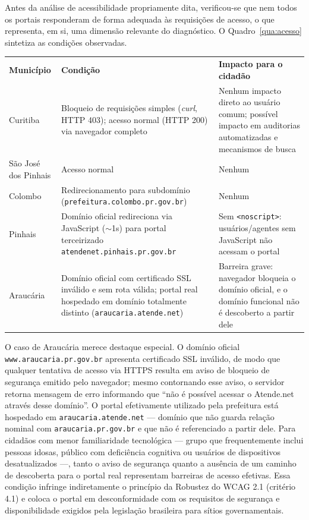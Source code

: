 \documentclass[brazil]{ifpr-pinhais}
\begin{document}
Antes da análise de acessibilidade propriamente dita, verificou-se que nem todos os portais responderam de forma adequada às requisições de acesso, o que representa, em si, uma dimensão relevante do diagnóstico. O Quadro~\ref{qua:acesso} sintetiza as condições observadas.

\begin{quadro}[htb]
\caption{Condições de acesso aos portais durante a coleta de dados}
\label{qua:acesso}
\begin{tabular}{p{2.8cm} p{6.2cm} p{5cm}}
\rowcolor{headerblue}
\color{white}\textbf{Município} & \color{white}\textbf{Condição} & \color{white}\textbf{Impacto para o cidadão} \\
Curitiba             & Bloqueio de requisições simples (\textit{curl}, HTTP 403); acesso normal (HTTP 200) via navegador completo & Nenhum impacto direto ao usuário comum; possível impacto em auditorias automatizadas e mecanismos de busca \\
São José dos Pinhais & Acesso normal                    & Nenhum \\
Colombo              & Redirecionamento para subdomínio (\texttt{prefeitura.colombo.pr.gov.br}) & Nenhum \\
Pinhais              & Domínio oficial redireciona via JavaScript ($\sim$1s) para portal terceirizado \texttt{atendenet.pinhais.pr.gov.br} & Sem \texttt{<noscript>}: usuários/agentes sem JavaScript não acessam o portal \\
Araucária            & Domínio oficial com certificado SSL inválido e sem rota válida; portal real hospedado em domínio totalmente distinto (\texttt{araucaria.atende.net}) & Barreira grave: navegador bloqueia o domínio oficial, e o domínio funcional não é descoberto a partir dele \\
\end{tabular}
\end{quadro}

O caso de Araucária merece destaque especial. O domínio oficial \texttt{www.araucaria.pr.gov.br} apresenta certificado SSL inválido, de modo que qualquer tentativa de acesso via HTTPS resulta em aviso de bloqueio de segurança emitido pelo navegador; mesmo contornando esse aviso, o servidor retorna mensagem de erro informando que ``não é possível acessar o Atende.net através desse domínio''. O portal efetivamente utilizado pela prefeitura está hospedado em \texttt{araucaria.atende.net} --- domínio que não guarda relação nominal com \texttt{araucaria.pr.gov.br} e que não é referenciado a partir dele. Para cidadãos com menor familiaridade tecnológica --- grupo que frequentemente inclui pessoas idosas, público com deficiência cognitiva ou usuários de dispositivos desatualizados ---, tanto o aviso de segurança quanto a ausência de um caminho de descoberta para o portal real representam barreiras de acesso efetivas. Essa condição infringe indiretamente o princípio da Robustez do WCAG 2.1 (critério 4.1) e coloca o portal em desconformidade com os requisitos de segurança e disponibilidade exigidos pela legislação brasileira para sítios governamentais.
\end{document}
